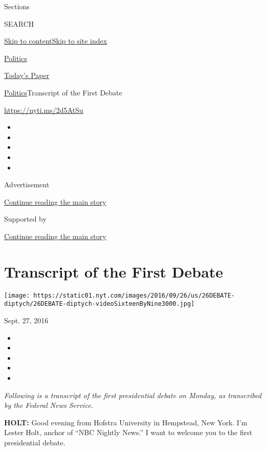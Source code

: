 Sections

SEARCH

\protect\hyperlink{site-content}{Skip to
content}\protect\hyperlink{site-index}{Skip to site index}

\href{https://www.nytimes.com/section/politics}{Politics}

\href{https://myaccount.nytimes.com/auth/login?response_type=cookie\&client_id=vi}{}

\href{https://www.nytimes.com/section/todayspaper}{Today's Paper}

\href{/section/politics}{Politics}\textbar{}Transcript of the First
Debate

\url{https://nyti.ms/2d5AtSu}

\begin{itemize}
\item
\item
\item
\item
\item
\end{itemize}

Advertisement

\protect\hyperlink{after-top}{Continue reading the main story}

Supported by

\protect\hyperlink{after-sponsor}{Continue reading the main story}

\hypertarget{transcript-of-the-first-debate}{%
\section{Transcript of the First
Debate}\label{transcript-of-the-first-debate}}

\texttt{[image: https://static01.nyt.com/images/2016/09/26/us/26DEBATE-diptych/26DEBATE-diptych-videoSixteenByNine3000.jpg]}

Sept. 27, 2016

\begin{itemize}
\item
\item
\item
\item
\item
\end{itemize}

\emph{Following is a transcript of the first presidential debate on
Monday, as transcribed by the Federal News Service.}

\textbf{HOLT:} Good evening from Hofstra University in Hempstead, New
York. I'm Lester Holt, anchor of ``NBC Nightly News.'' I want to welcome
you to the first presidential debate.

